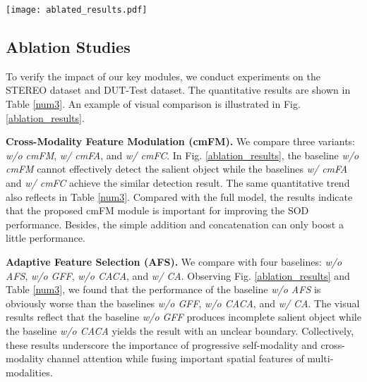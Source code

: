 \documentclass[runningheads]{llncs}
\newcommand{\ie}{\textit{i}.\textit{e}.}
\begin{document}
\begin{figure*}[!t]
	\centering
	\texttt{[image: ablated\_results.pdf]}
	\caption{Visual comparison with different baselines. \textbf{(1)} The baseline \textit{w/o cmFM} represents our full model without the cmFM module (\ie, no modulated features); and the baselines \textit{w/ cmFA} and \textit{w/ cmFC} refer to that the cmFM module is replaced by the cmFA or cmFC module (\ie, the depth and RGB features are integrated by the element-wise addition or concatenation). \textbf{(2)} The baseline \textit{w/o AFS} represents our full model without the AFS module (\ie, the features after cmFM module are directly concatenated with the up-sampled saliency-related features); the baselines \textit{w/o GFF} and \textit{w/o CACA} correspond to removing the fused spatial features and the channel attention-on-channel attention features, respectively; and the baseline  \textit{w/ CA} refers to that the AFS module is replaced by the conventional channel attention module \cite{ChannelAtt}. \textbf{(3)} The baselines \textit{w/o PEA}, \textit{w/o PA}, and \textit{w/o PE} correspond to our full model without the sg-PEA module, the position attention unit, and the edge attention unit, respectively.}
	\label{ablation_results}
\end{figure*}


\subsection{Ablation Studies}


To verify the impact of our key modules, we conduct experiments on the STEREO dataset and DUT-Test dataset. The quantitative results are shown in Table \ref{num3}. An example of visual comparison is illustrated in Fig. \ref{ablation_results}.


\noindent
\textbf{Cross-Modality Feature Modulation (cmFM).} We compare three variants: \textit{w/o cmFM}, \textit{w/ cmFA}, and \textit{w/ cmFC}. In Fig. \ref{ablation_results}, the baseline  \textit{w/o cmFM} cannot effectively detect the salient object while the baselines \textit{w/ cmFA} and \textit{w/ cmFC} achieve the similar detection result. The same quantitative trend also reflects in  Table \ref{num3}. Compared with the full model, the results indicate that the proposed cmFM module is important for improving the SOD performance. Besides, the simple addition and concatenation can only boost a little performance.

\noindent
\textbf{Adaptive Feature Selection (AFS).}
We compare with four baselines: \textit{w/o AFS}, \textit{w/o GFF}, \textit{w/o CACA}, and \textit{ w/ CA}.   Observing Fig. \ref{ablation_results} and Table \ref{num3}, we found that the performance of the baseline  \textit{w/o AFS} is obviously worse than the baselines \textit{w/o GFF}, \textit{w/o CACA}, and \textit{w/ CA}. The visual results reflect that the baseline \textit{w/o GFF} produces incomplete salient object while the baseline \textit{w/o CACA} yields the result with an unclear boundary.  Collectively, these results underscore the importance of progressive self-modality and cross-modality channel attention while fusing important spatial features of multi-modalities.
\end{document}
